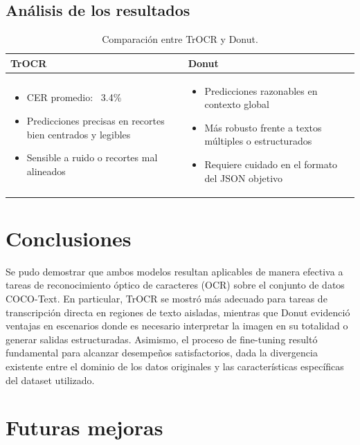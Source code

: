 \documentclass[12pt]{article}
\begin{document}
\subsection{Análisis de los resultados}

\begin{table}[h!]
\centering
\begin{tabular}{|p{6cm}|p{6cm}|}
\hline
\textbf{TrOCR} & \textbf{Donut} \\
\hline
\begin{itemize}
    \item CER promedio: ~3.4\%
    \item Predicciones precisas en recortes bien centrados y legibles
    \item Sensible a ruido o recortes mal alineados
\end{itemize}
&
\begin{itemize}
    \item Predicciones razonables en contexto global
    \item Más robusto frente a textos múltiples o estructurados
    \item Requiere cuidado en el formato del JSON objetivo
\end{itemize}
\\
\hline
\end{tabular}
\caption{Comparación entre TrOCR y Donut.}
\label{tab:ventajas}
\end{table}


\section{Conclusiones}

Se pudo demostrar que ambos modelos resultan aplicables de manera efectiva a tareas de 
reconocimiento óptico de caracteres (OCR) sobre el conjunto de datos COCO-Text. En particular,
TrOCR se mostró más adecuado para tareas de transcripción directa en regiones de texto 
aisladas, mientras que Donut evidenció ventajas en escenarios donde es necesario interpretar 
la imagen en su totalidad o generar salidas estructuradas.
Asimismo, el proceso de fine-tuning resultó fundamental para alcanzar desempeños 
satisfactorios, dada la divergencia existente entre el dominio de los datos originales y
las características específicas del dataset utilizado.

\section{Futuras mejoras}
\end{document}
